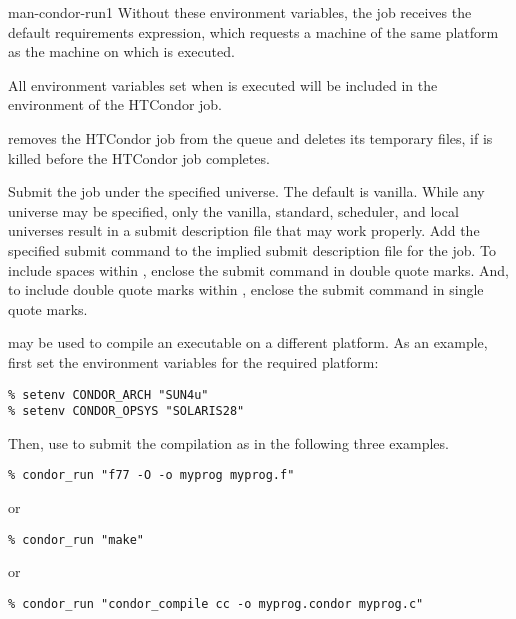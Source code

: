 \begin{ManPage}{}{man-condor-run}{1}
Without these environment variables, 
the job receives the default requirements expression, which
requests a machine of the same platform as
the machine on which  is executed.

All environment variables set when  is executed will be
included in the environment of the HTCondor job.

 removes the HTCondor job from the queue and
deletes its temporary files, if  is killed before the 
HTCondor job completes.

\begin{Options}

  {Submit the job under the specified universe. The default is vanilla.
  While any universe may be specified, only the vanilla, standard,
  scheduler, and local universes result in a submit description
  file that may work properly.}
  {Add the specified submit command to the implied submit description file
  for the job. To include spaces within ,
  enclose the submit command in double quote marks. 
  And, to include double quote marks within ,
  enclose the submit command in single quote marks. }

\end{Options}

\Examples

 may be used to compile an executable on
a different platform.
As an example, first set the environment variables for
the required platform:

\begin{verbatim}
% setenv CONDOR_ARCH "SUN4u"
% setenv CONDOR_OPSYS "SOLARIS28"
\end{verbatim}

Then, use  to submit the compilation as in the
following three examples.
\begin{verbatim}
% condor_run "f77 -O -o myprog myprog.f"
\end{verbatim}
or
\begin{verbatim}
% condor_run "make"
\end{verbatim}
or
\begin{verbatim}
% condor_run "condor_compile cc -o myprog.condor myprog.c"
\end{verbatim}


\Files


\end{ManPage}
